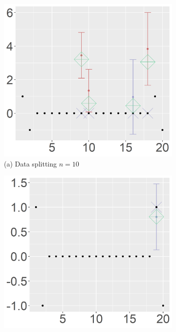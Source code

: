 \captionsetup[subfigure]{labelformat=empty}
\begin{figure}[ht!]
\centering
\begin{subfigure}[b]{.32\columnwidth} 
    \includegraphics[width=\columnwidth]{../../plot/split_10_1_1.png}
    \caption{(a) Data splitting $n=10$}
    \label{fig:split10}
\end{subfigure}
\hfill
\centering
\begin{subfigure}[b]{.32\columnwidth} 
    \includegraphics[width=\columnwidth]{../../plot/p1_10_1_1.png}

\end{subfigure}
\end{figure}
